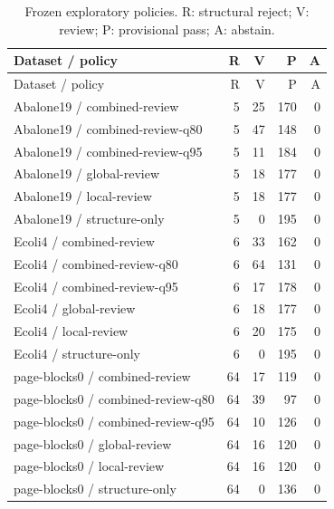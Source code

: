 \begin{longtable}{lrrrr}
\caption{Frozen exploratory policies. R: structural reject; V: review; P: provisional pass; A: abstain.}\label{tab:shadow}\\
\toprule
Dataset / policy & R & V & P & A \\
\midrule
\endfirsthead
\toprule
Dataset / policy & R & V & P & A \\
\midrule
\endhead
Abalone19 / combined-review & 5 & 25 & 170 & 0 \\
Abalone19 / combined-review-q80 & 5 & 47 & 148 & 0 \\
Abalone19 / combined-review-q95 & 5 & 11 & 184 & 0 \\
Abalone19 / global-review & 5 & 18 & 177 & 0 \\
Abalone19 / local-review & 5 & 18 & 177 & 0 \\
Abalone19 / structure-only & 5 & 0 & 195 & 0 \\
Ecoli4 / combined-review & 6 & 33 & 162 & 0 \\
Ecoli4 / combined-review-q80 & 6 & 64 & 131 & 0 \\
Ecoli4 / combined-review-q95 & 6 & 17 & 178 & 0 \\
Ecoli4 / global-review & 6 & 18 & 177 & 0 \\
Ecoli4 / local-review & 6 & 20 & 175 & 0 \\
Ecoli4 / structure-only & 6 & 0 & 195 & 0 \\
page-blocks0 / combined-review & 64 & 17 & 119 & 0 \\
page-blocks0 / combined-review-q80 & 64 & 39 & 97 & 0 \\
page-blocks0 / combined-review-q95 & 64 & 10 & 126 & 0 \\
page-blocks0 / global-review & 64 & 16 & 120 & 0 \\
page-blocks0 / local-review & 64 & 16 & 120 & 0 \\
page-blocks0 / structure-only & 64 & 0 & 136 & 0 \\
\bottomrule
\end{longtable}
